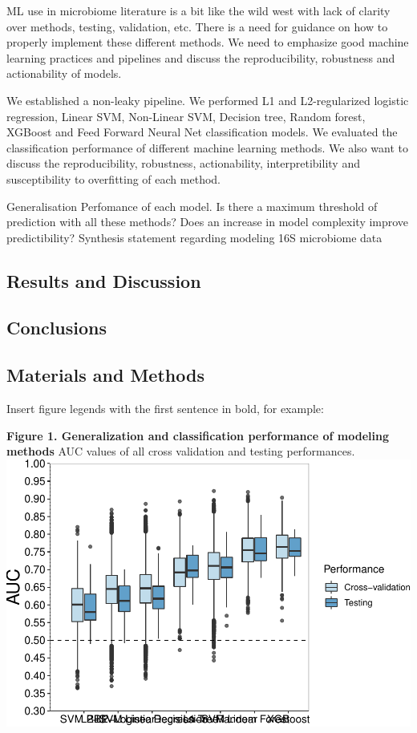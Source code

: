 \documentclass[11pt,]{article}
\begin{document}
ML use in microbiome literature is a bit like the wild west with lack of
clarity over methods, testing, validation, etc. There is a need for
guidance on how to properly implement these different methods. We need
to emphasize good machine learning practices and pipelines and discuss
the reproducibility, robustness and actionability of models.

We established a non-leaky pipeline. We performed L1 and L2-regularized
logistic regression, Linear SVM, Non-Linear SVM, Decision tree, Random
forest, XGBoost and Feed Forward Neural Net classification models. We
evaluated the classification performance of different machine learning
methods. We also want to discuss the reproducibility, robustness,
actionability, interpretibility and susceptibility to overfitting of
each method.

Generalisation Perfomance of each model. Is there a maximum threshold of
prediction with all these methods? Does an increase in model complexity
improve predictibility? Synthesis statement regarding modeling 16S
microbiome data

\subsection{Results and Discussion}\label{results-and-discussion}

\subsection{Conclusions}\label{conclusions}

\subsection{Materials and Methods}\label{materials-and-methods}

\newpage

Insert figure legends with the first sentence in bold, for example:

\textbf{Figure 1. Generalization and classification performance of
modeling methods } AUC values of all cross validation and testing
performances.
\includegraphics{manuscript_files/figure-latex/unnamed-chunk-1-1.pdf}
\end{document}
